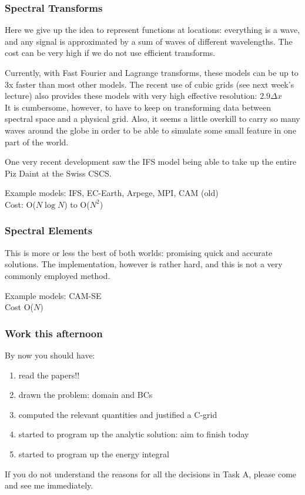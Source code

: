 \documentclass[xcolor=dvipsnames]{beamer} %
\newcommand{\BSS}{ \begin{scriptsize}}
\newcommand{\ESS}{ \end{scriptsize}}
\begin{document}
\frame
{
	\frametitle{Spectral Transforms}
	\BSS	
	Here we give up the idea to represent functions at locations: everything is a wave, and any signal is approximated by a sum of waves of different wavelengths.
	The cost can be very high if we do not use efficient transforms.
	
	\smallskip
	Currently, with Fast Fourier and Lagrange transforms, these models can be up to 3x faster than most other models. The recent use of cubic grids (see next week's lecture) also provides these models with very high effective resolution: $2.9 \Delta x$\\
	
	\smallskip
	It is cumbersome, however, to have to keep on transforming data between spectral space and a physical grid.	Also, it seems a little overkill to carry so many waves around the globe in order to be able to simulate some small feature in one part of the world.
	
	\smallskip
	One very recent development saw the IFS model being able to take up the entire Piz Daint at the Swiss CSCS. 
	
	\medskip
	Example models: IFS, EC-Earth, Arpege, MPI, CAM (old)\\
	\medskip
	Cost: O($N \log N$) to O($N^2$)
	\ESS
}

\frame
{
	\frametitle{Spectral Elements}	
	This is more or less the best of both worlds: promising quick and accurate solutions. The implementation, however is rather hard, and this is not a very commonly employed method.
	
	\medskip
	Example models: CAM-SE\\
	\medskip
	Cost O($N$)	
}


\frame
{
	\frametitle{Work this afternoon}
	\BSS
	By now you should have:
	\begin{enumerate}
		\item read the papers!!
		\item drawn the problem: domain and BCs
		\item computed the relevant quantities and justified a C-grid
		\item started to program up the analytic solution: aim to finish today
		\item started to program up the energy integral
	\end{enumerate}
	\medskip
	If you do not understand the reasons for all the decisions in Task A, please come and see me immediately.
	\ESS
}
\end{document}
